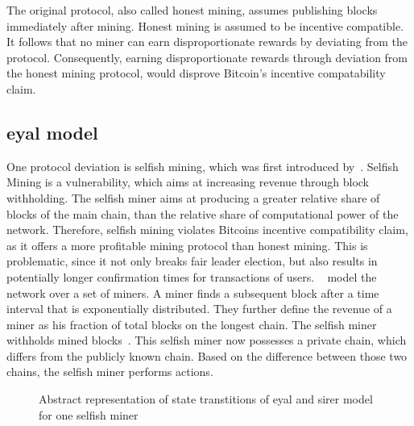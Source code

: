The original protocol, also called honest mining, assumes publishing blocks immediately after mining. Honest mining is assumed to be incentive compatible. It follows that no miner can earn disproportionate rewards by deviating from the protocol.
Consequently, earning disproportionate rewards through deviation from the honest mining protocol, would disprove Bitcoin's incentive compatability claim.

\subsection{eyal model}\label{eyalmodel}
One protocol deviation is selfish mining, which was first introduced by~\cite{eyal}.
Selfish Mining is a vulnerability, which aims at increasing revenue through block withholding. The selfish miner aims at producing a greater relative share of blocks of the main chain, than the relative share of computational power of the network. Therefore, selfish mining violates Bitcoins incentive compatibility claim, as it offers a more profitable mining protocol than honest mining. This is problematic, since it not only breaks fair leader election, but also results in potentially longer confirmation times for transactions of users.
~\citeauthor{eyal} model the network over a set of miners. A miner finds a subsequent block after a time interval that is exponentially distributed\cite{eyal}. They further define the revenue of a miner as his fraction of total blocks on the longest chain.
The selfish miner withholds mined blocks~\cite{eyal}. This selfish miner now possesses a private chain, which differs from the publicly known chain. Based on the difference between those two chains, the selfish miner performs actions. 
\begin{figure}
\begin{center}
\end{center}
   \caption{Abstract representation of state transtitions of eyal and sirer model for one selfish miner}
\label{fig:eyal_model}

\end{figure}
